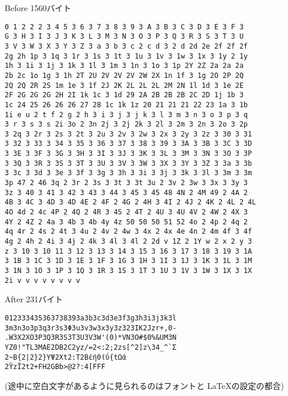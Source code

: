 \documentclass[12pt,unicode]{beamer}
\begin{document}
\begin{frame}[fragile]{Before 1560バイト}
   \begin{Verbatim}[fontsize=\tiny]
0 1 2 2 2 3 4 5 3 6 3 7 3 8 3 9 3 A 3 B 3 C 3 D 3 E 3 F 3
G 3 H 3 I 3 J 3 K 3 L 3 M 3 N 3 O 3 P 3 Q 3 R 3 S 3 T 3 U
3 V 3 W 3 X 3 Y 3 Z 3 a 3 b 3 c 2 c d 3 2 d 2d 2e 2f 2f 2f
2g 2h 1p 3 1q 3 1r 3 1s 3 1t 3 1u 3 1v 3 1w 3 1x 3 1y 2 1y
1h 3 1i 3 1j 3 1k 3 1l 3 1m 3 1n 3 1o 3 1p 2Y 2Z 2a 2a 2a
2b 2c 1o 1g 3 1h 2T 2U 2V 2V 2V 2W 2X 1n 1f 3 1g 2O 2P 2Q
2Q 2Q 2R 2S 1m 1e 3 1f 2J 2K 2L 2L 2L 2M 2N 1l 1d 3 1e 2E
2F 2G 2G 2G 2H 2I 1k 1c 3 1d 29 2A 2B 2B 2B 2C 2D 1j 1b 3
1c 24 25 26 26 26 27 28 1c 1k 1z 20 21 21 21 22 23 1a 3 1b
1i e u 2 t f 2 g 2 h 3 i 3 j 3 j k 3 l 3 m 3 n 3 o 3 p 3 q
3 r 3 s 3 s 2i 3o 2 3n 2j 3 2j 2k 3 2l 3 2m 3 2n 3 2o 3 2p
3 2q 3 2r 3 2s 3 2t 3 2u 3 2v 3 2w 3 2x 3 2y 3 2z 3 30 3 31
3 32 3 33 3 34 3 35 3 36 3 37 3 38 3 39 3 3A 3 3B 3 3C 3 3D
3 3E 3 3F 3 3G 3 3H 3 3I 3 3J 3 3K 3 3L 3 3M 3 3N 3 3O 3 3P
3 3Q 3 3R 3 3S 3 3T 3 3U 3 3V 3 3W 3 3X 3 3Y 3 3Z 3 3a 3 3b
3 3c 3 3d 3 3e 3 3f 3 3g 3 3h 3 3i 3 3j 3 3k 3 3l 3 3m 3 3m
3p 47 2 46 3q 2 3r 2 3s 3 3t 3 3t 3u 2 3v 2 3w 3 3x 3 3y 3
3z 3 40 3 41 3 42 3 43 3 44 3 45 3 45 48 4N 2 4M 49 2 4A 2
4B 3 4C 3 4D 3 4D 4E 2 4F 2 4G 2 4H 3 4I 2 4J 2 4K 2 4L 2 4L
4O 4d 2 4c 4P 2 4Q 2 4R 3 4S 2 4T 2 4U 3 4U 4V 2 4W 2 4X 3
4Y 2 4Z 2 4a 3 4b 3 4b 4y 4z 50 50 50 51 52 4o 2 4p 2 4q 2
4q 4r 2 4s 2 4t 3 4u 2 4v 2 4w 3 4x 2 4x 4e 4n 2 4m 4f 3 4f
4g 2 4h 2 4i 3 4j 2 4k 3 4l 3 4l 2 2d v 1Z 2 1Y w 2 x 2 y 3
z 3 10 3 10 11 3 12 3 13 3 14 3 15 3 16 3 17 3 18 3 19 3 1A
3 1B 3 1C 3 1D 3 1E 3 1F 3 1G 3 1H 3 1I 3 1J 3 1K 3 1L 3 1M
3 1N 3 1O 3 1P 3 1Q 3 1R 3 1S 3 1T 3 1U 3 1V 3 1W 3 1X 3 1X
2i v v v v v v v v
   \end{Verbatim}
\end{frame}
\begin{frame}[fragile]{After 231バイト}
   \begin{verbatim}
012333435363738393a3b3c3d3e3f3g3h3i3j3k3l
3m3n3o3p3q3r3s3Φ3u3v3w3x3y3z323IK2Jzr+,0-
.W3X2XO3P3Q3R3S3T3U3V3W'(0)*VN3O#$0%&UM3N
YZ0!"TL3MAE2DB2C2yz/=2<:2;2zs[^2]z\34_^`Σ
2~B{2|2}2}ΥΨ2Χt2:Τ2Bέή0ίΰ{tΩά
2ΫzΪ2t2+FH2GBb>@2?:4[FFF
   \end{verbatim}

   (途中に空白文字があるように見られるのはフォントと \LaTeX の設定の都合)
\end{frame}
\end{document}
